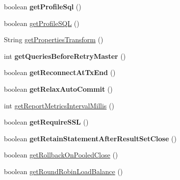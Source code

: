 \begin{DoxyCompactItemize}
boolean {\bfseries get\+Profile\+Sql} ()
\item 
boolean \mbox{\hyperlink{classcom_1_1mysql_1_1jdbc_1_1_connection_properties_impl_a8996c90f639a9d9223f7ffe0124e1129}{get\+Profile\+S\+QL}} ()
\item 
String \mbox{\hyperlink{classcom_1_1mysql_1_1jdbc_1_1_connection_properties_impl_a4eb7aa6de496a4aa67a85509de9f46a7}{get\+Properties\+Transform}} ()
\item 
\mbox{\label{classcom_1_1mysql_1_1jdbc_1_1_connection_properties_impl_affd71444a9e133358ffc9b7035bbb2bc}} 
int {\bfseries get\+Queries\+Before\+Retry\+Master} ()
\item 
\mbox{\label{classcom_1_1mysql_1_1jdbc_1_1_connection_properties_impl_a20af4b0977a5251e9f4cf301730ee746}} 
boolean {\bfseries get\+Reconnect\+At\+Tx\+End} ()
\item 
\mbox{\label{classcom_1_1mysql_1_1jdbc_1_1_connection_properties_impl_a4c1c9a32e3291de0267833bb91550b9e}} 
boolean {\bfseries get\+Relax\+Auto\+Commit} ()
\item 
int \mbox{\hyperlink{classcom_1_1mysql_1_1jdbc_1_1_connection_properties_impl_a4edd40bce78479f65769de2f31a13efc}{get\+Report\+Metrics\+Interval\+Millis}} ()
\item 
\mbox{\label{classcom_1_1mysql_1_1jdbc_1_1_connection_properties_impl_a03715721f5eb37c9243ffb8f685eeb58}} 
boolean {\bfseries get\+Require\+S\+SL} ()
\item 
\mbox{\label{classcom_1_1mysql_1_1jdbc_1_1_connection_properties_impl_a673275bdaad6e48725fd2bdb6c00c641}} 
boolean {\bfseries get\+Retain\+Statement\+After\+Result\+Set\+Close} ()
\item 
boolean \mbox{\hyperlink{classcom_1_1mysql_1_1jdbc_1_1_connection_properties_impl_a0fae8f273bff1dfd51555b3b130cef9a}{get\+Rollback\+On\+Pooled\+Close}} ()
\item 
boolean \mbox{\hyperlink{classcom_1_1mysql_1_1jdbc_1_1_connection_properties_impl_ab5b838d6a5a885610d48c21ec6380d84}{get\+Round\+Robin\+Load\+Balance}} ()
\item 

\end{DoxyCompactItemize}
